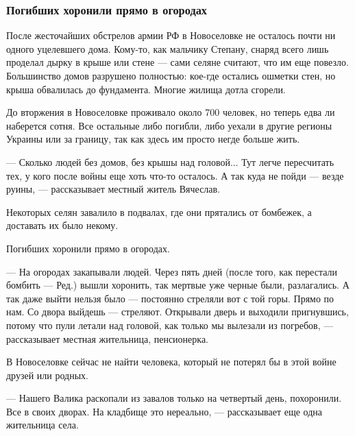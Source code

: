  
 
 
 
 

\subsubsection{Погибших хоронили прямо в огородах}
\label{sec:17_04_2022.stz.news.ua.strana.1.chernigov.2.ogorody}

После жесточайших обстрелов армии РФ в Новоселовке не осталось почти ни одного
уцелевшего дома. Кому-то, как мальчику Степану, снаряд всего лишь проделал
дырку в крыше или стене — сами селяне считают, что им еще повезло. Большинство
домов разрушено полностью: кое-где остались ошметки стен, но крыша обвалилась
до фундамента. Многие жилища дотла сгорели. 

До вторжения в Новоселовке проживало около 700 человек, но теперь едва ли
наберется сотня. Все остальные либо погибли, либо уехали в другие регионы
Украины или за границу, так как здесь им просто негде больше жить.

— Сколько людей без домов, без крышы над головой... Тут легче пересчитать тех, у
кого после войны еще хоть что-то осталось. А так куда не пойди — везде руины, —
рассказывает местный житель Вячеслав.


Некоторых селян завалило в подвалах, где они прятались от бомбежек, а доставать
их было некому.

Погибших хоронили прямо в огородах.

— На огородах закапывали людей. Через пять дней (после того, как перестали
бомбить — Ред.) вышли хоронить, так мертвые уже черные были, разлагались. А так
даже выйти нельзя было — постоянно стреляли вот с той горы. Прямо по нам. Со
двора выйдешь — стреляют. Открывали дверь и выходили пригнувшись, потому что
пули летали над головой, как только мы вылезали из погребов, — рассказывает
местная жительница, пенсионерка. 

В Новоселовке сейчас не найти человека, который не потерял бы в этой войне
друзей или родных. 

— Нашего Валика раскопали из завалов только на четвертый день, похоронили. Все
в своих дворах. На кладбище это нереально, — рассказывает еще одна жительница
села.

